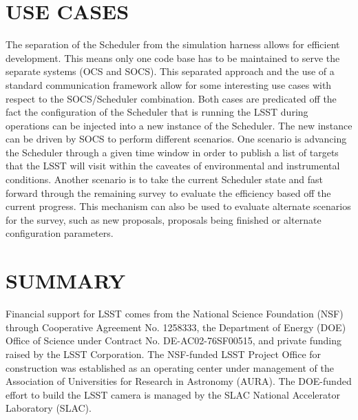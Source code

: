 \documentclass[]{spie}  %
\begin{document}
\section{USE CASES}

The separation of the Scheduler from the simulation harness allows for efficient development. This means only one code base has to be maintained to serve the separate systems (OCS and SOCS). This separated approach and the use of a standard communication framework allow for some interesting use cases with respect to the SOCS/Scheduler combination. Both cases are predicated off the fact the configuration of the Scheduler that is running the LSST during operations can be injected into a new instance of the Scheduler. The new instance can be driven by SOCS to perform different scenarios. One scenario is advancing the Scheduler through a given time window in order to publish a list of targets that the LSST will visit within the caveates of environmental and instrumental conditions. Another scenario is to take the current Scheduler state and fast forward through the remaining survey to evaluate the efficiency based off the current progress. This mechanism can also be used to evaluate alternate scenarios for the survey, such as new proposals, proposals being finished or alternate configuration parameters.

\section{SUMMARY}

\acknowledgments %

Financial support for LSST comes from the National Science Foundation (NSF) through Cooperative Agreement No. 1258333, the Department of Energy (DOE) Office of Science under Contract No. DE-AC02-76SF00515, and private funding raised by the LSST Corporation. The NSF-funded LSST Project Office for construction was established as an operating center under management of the Association of Universities for Research in Astronomy (AURA).  The DOE-funded effort to build the LSST camera is managed by the SLAC National Accelerator Laboratory (SLAC).    

\end{document}

